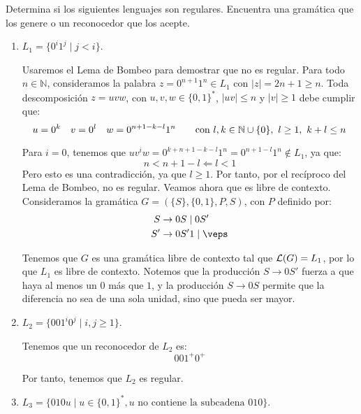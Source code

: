 \begin{ejercicio}\label{ej:1.3.4}
    Determina si los siguientes lenguajes son regulares. Encuentra una gramática que los genere o un reconocedor que los acepte.
    \begin{enumerate}
        \item $L_1 = \{0^i 1^j \mid j < i\}$.
        
        Usaremos el Lema de Bombeo para demostrar que no es regular. Para todo $n\in \mathbb{N}$, consideramos la palabra $z=0^{n+1}1^{n}\in L_1$ con $|z|=2n+1\geq n$. Toda descomposición $z=uvw$, con $u,v,w\in \{0,1\}^\ast$, $|uv|\leq n$ y $|v|\geq 1$ debe cumplir que:
        \begin{equation*}
            u=0^k \quad v=0^l \quad w=0^{n+1-k-l}1^{n} \qquad \text{con } l,k\in \mathbb{N}\cup \{0\},~l\geq 1,~k+l\leq n
        \end{equation*}

        Para $i=0$, tenemos que $uv^iw=0^{k+n+1-k-l}1^{n}=0^{n+1-l}1^{n}\notin L_1$, ya que:
        \begin{equation*}
            n < n+1-l \Longleftarrow l<1
        \end{equation*}
        Pero esto es una contradicción, ya que $l\geq 1$. Por tanto, por el recíproco del Lema de Bombeo, no es regular.
        Veamos ahora que es libre de contexto. Consideramos la gramática $G=(\{S\},\{0,1\},P,S)$, con $P$ definido por:
        \begin{align*}
            S &\rightarrow 0S \mid 0S'\\
            S' &\rightarrow 0S'1 \mid \veps
        \end{align*}

        Tenemos que $G$ es una gramática libre de contexto tal que $\mathcal{L}(G)=L_1$, por lo que $L_1$ es libre de contexto. Notemos que
        la producción $S\rightarrow 0S'$ fuerza a que haya al menos un $0$ más que $1$, y la producción $S\rightarrow 0S$ permite que la diferencia no sea de una sola unidad, sino que pueda ser mayor.

        \item $L_2 = \{001^i 0^j \mid i,j \geq 1\}$.
        
        Tenemos que un reconocedor de $L_2$ es:
        \begin{equation*}
            001^+0^+
        \end{equation*}

        Por tanto, tenemos que $L_2$ es regular.
        \item $L_3 = \{010u \mid u \in {\{0,1\}}^{\ast}, u \text{ no contiene la subcadena } 010\}$.
        

\end{enumerate}
\end{ejercicio}
